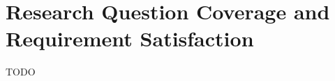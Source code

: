 \section{Research Question Coverage and Requirement Satisfaction} %


\begin{justify}
    TODO
\end{justify}






